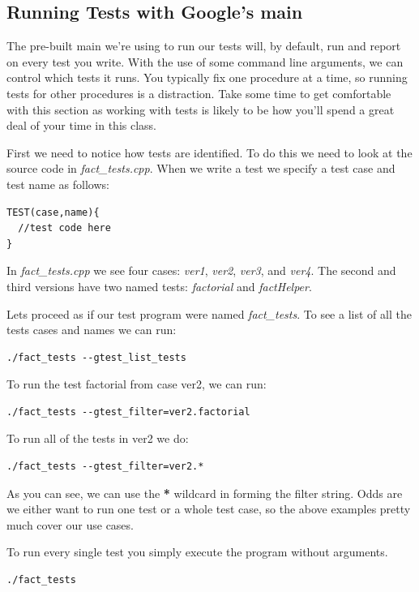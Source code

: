 \documentclass[]{tufte-handout}
\begin{document}
\subsection{Running Tests with Google's main}


The pre-built main we're using to run our tests will, by default, run and report on every test you write. With the use of some command line arguments, we can control which tests it runs.  You  typically fix one procedure at a time, so running tests for other procedures is a distraction. Take some time to get comfortable with this section as working with tests is likely to be how you'll spend a great deal of your time in this class. 

First we need to notice how tests are identified. To do this we need to look at the source code in \textit{fact\_tests.cpp}. When we write a test we specify a test case and test name as follows:
\begin{verbatim}
TEST(case,name){ 
  //test code here
}
\end{verbatim}
In \textit{fact\_tests.cpp} we see four cases: \textit{ver1}, \textit{ver2}, \textit{ver3}, and \textit{ver4}. The second and third versions have two named tests: \textit{factorial} and \textit{factHelper}.  

Lets proceed as if our test program were named \textit{fact\_tests}. To see a list of all the tests cases and names we can run:
\begin{verbatim} 
./fact_tests --gtest_list_tests
\end{verbatim}
To run the test factorial from case ver2, we can run:
\begin{verbatim}
./fact_tests --gtest_filter=ver2.factorial
\end{verbatim}
To run all of the tests in ver2 we do:
\begin{verbatim}
./fact_tests --gtest_filter=ver2.*
\end{verbatim}
As you can see, we can use the \textbf{*} wildcard in forming the filter string. Odds are we either want to run one test or a whole test case, so the above examples pretty much cover our use cases.

To run every single test you simply execute the program without arguments.
\begin{verbatim}
./fact_tests
\end{verbatim}
\end{document}

